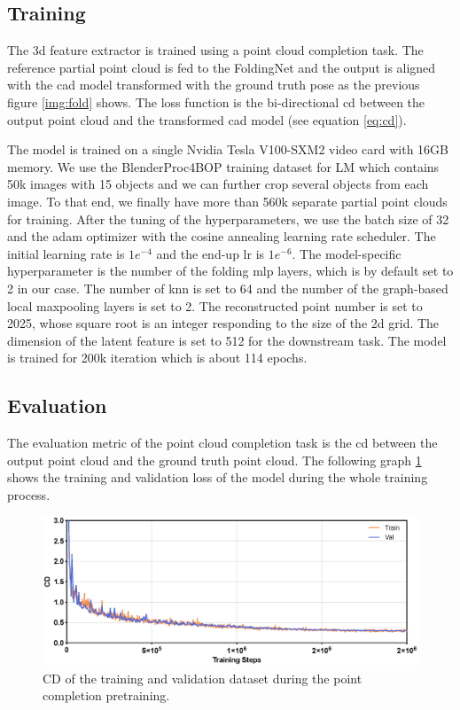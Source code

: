 \documentclass[12pt,DIV14,BCOR12mm,a4paper,footinclude=false,headinclude,parskip=half-,twoside,openright,cleardoublepage=empty,toc=index,bibliography=totoc,listof=totoc]{scrreprt}
\numberwithin{equation}{chapter}
\begin{document}
\subsection{Training} 
The \gls{3d} feature extractor is trained using a point cloud completion task. The reference partial point cloud is fed to the FoldingNet and the output is aligned with the \gls{cad} model transformed with the ground truth pose as the previous figure \ref{img:fold} shows. The loss function is the bi-directional \gls{cd} between the output point cloud and the transformed \gls{cad} model (see equation \ref{eq:cd}).

The model is trained on a single Nvidia Tesla V100-SXM2 video card with 16GB memory. We use the BlenderProc4BOP training dataset for LM which contains 50k images with 15 objects and we can further crop several objects from each image. To that end, we finally have more than 560k separate partial point clouds for training. After the tuning of the hyperparameters, we use the batch size of 32 and the \gls{adam} optimizer with the cosine annealing learning rate scheduler. The initial learning rate is $1e^{-4}$ and the end-up \gls{lr} is $1e^{-6}$. The model-specific hyperparameter is the number of the folding \gls{mlp} layers, which is by default set to 2 in our case. The number of \gls{knn} is set to 64 and the number of the graph-based local maxpooling layers is set to 2. The reconstructed point number is set to 2025, whose square root is an integer responding to the size of the \gls{2d} grid. The dimension of the latent feature is set to 512 for the downstream task. The model is trained for 200k iteration which is about 114 epochs.
\subsection{Evaluation} 
The evaluation metric of the point cloud completion task is the \gls{cd} between the output point cloud and the ground truth point cloud. The following graph \ref{img:fold_loss} shows the training and validation loss of the model during the whole training process. 

\begin{figure}[h]
	\centering
	\includegraphics[width=1.\textwidth]{img/fold_loss.eps}
	\caption{CD of the training and validation dataset during the point completion pretraining.}
	\label{img:fold_loss}
\end{figure}
\end{document}
